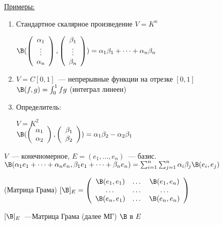 \underline{Примеры:}
\begin{enumerate}
    \item Стандартное скалярное произведение
    $V = K^n$

    $\B(
       \left(\begin{array}{c}
       \alpha_1 \\ 
       \vdots \\ 
       \alpha_n
       \end{array}\right),
       \left(\begin{array}{c}
       \beta_1 \\ 
       \vdots \\
       \beta_n
       \end{array}\right)
    ) = \alpha_1 \beta_1 + \dots + \alpha_n \beta_n$

    \item $V = C[0, 1]$~--- непрерывные функции на отрезке $[0, 1]$ \\
    $\B(f, g) = \int_{0}^{1} fg$ (интеграл линеен)

    \item Определитель:

    $V = K^2$ \\
    $\B(
        \left(\begin{array}{c}
        \alpha_1 \\ 
        \alpha_2
        \end{array}\right),
        \left(\begin{array}{c}
        \beta_1 \\ 
        \beta_2
        \end{array}\right)
    ) = \alpha_1 \beta_2 - \alpha_2 \beta_1$
\end{enumerate}


$V$~--- конечномерное, $E = (e_1, \dots, e_n)$~--- базис.
$\B(\alpha_1 e_1 + \dots + \alpha_n e_n, \beta_1 e_1 + \dots + \beta_n e_n) = 
\sum_{i=1}^{n} \sum_{j = 1}^{n} \alpha_i \beta_j \B(e_i, e_j)$

\begin{conj}(Матрица Грама)
$[\B]_E = \left(\begin{array}{ccc}
\B(e_1, e_1) & \dots & \B(e_1, e_n) \\ 
\dots & \dots & \dots \\ 
\B(e_n, e_1) & \dots & \B(e_n, e_n)
\end{array}\right)$

$[\B]_E$~---Матрица Грама (далее МГ) $\B$ в $E$
\end{conj}

